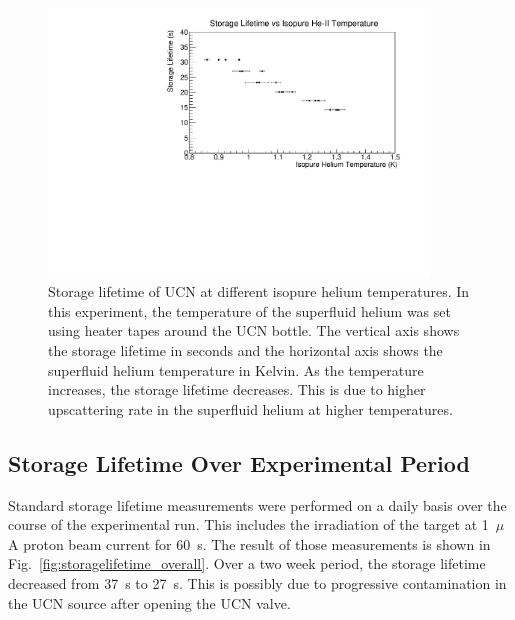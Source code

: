 \begin{figure}[h!]
  \centering
  \includegraphics[width=0.9\textwidth]{StorageLifetime_vs_temp.pdf}
  \caption[UCN storage lifetime at different isopure helium
  temperatures]{Storage lifetime of UCN at different isopure helium
    temperatures. In this experiment, the temperature of the
    superfluid helium was set using heater tapes around the UCN
    bottle. The vertical axis shows the storage lifetime in seconds
    and the horizontal axis shows the superfluid helium temperature in
    Kelvin. As the temperature increases, the storage lifetime
    decreases. This is due to higher upscattering rate in the
    superfluid helium at higher temperatures.}
  \label{fig:storagelifetime_vs_temp}
\end{figure}



\subsection{Storage Lifetime Over Experimental Period\label{sec:storage_overall}}

Standard storage lifetime measurements were performed on a daily basis
over the course of the experimental run. This includes the irradiation
of the target at 1~$\mu$A proton beam current for 60~s. The result of
those measurements is shown in
Fig.~\ref{fig:storagelifetime_overall}. Over a two week period, the
storage lifetime decreased from 37~s to 27~s. This is possibly due to
progressive contamination in the UCN source after opening the UCN
valve.


